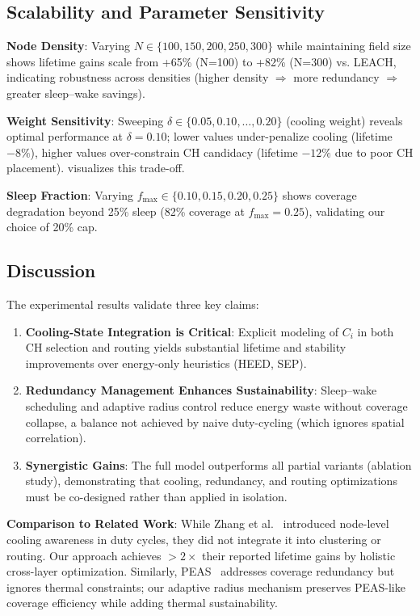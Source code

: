 \subsection{Scalability and Parameter Sensitivity}

\textbf{Node Density}: Varying $N \in \{100, 150, 200, 250, 300\}$ while maintaining field size shows lifetime gains scale from +65\% (N=100) to +82\% (N=300) vs. LEACH, indicating robustness across densities (higher density $\Rightarrow$ more redundancy $\Rightarrow$ greater sleep--wake savings).

\textbf{Weight Sensitivity}: Sweeping $\delta \in \{0.05, 0.10, \ldots, 0.20\}$ (cooling weight) reveals optimal performance at $\delta=0.10$; lower values under-penalize cooling (lifetime $-8\%$), higher values over-constrain CH candidacy (lifetime $-12\%$ due to poor CH placement).  visualizes this trade-off.

\textbf{Sleep Fraction}: Varying $f_{\max} \in \{0.10, 0.15, 0.20, 0.25\}$ shows coverage degradation beyond 25\% sleep (82\% coverage at $f_{\max}=0.25$), validating our choice of 20\% cap.

\subsection{Discussion}

The experimental results validate three key claims:
\begin{enumerate}[label=(\Roman*)]
  \item \textbf{Cooling-State Integration is Critical}: Explicit modeling of $C_i$ in both CH selection and routing yields substantial lifetime and stability improvements over energy-only heuristics (HEED, SEP).
  \item \textbf{Redundancy Management Enhances Sustainability}: Sleep--wake scheduling and adaptive radius control reduce energy waste without coverage collapse, a balance not achieved by naive duty-cycling (which ignores spatial correlation).
  \item \textbf{Synergistic Gains}: The full model outperforms all partial variants (ablation study), demonstrating that cooling, redundancy, and routing optimizations must be co-designed rather than applied in isolation.
\end{enumerate}

\textbf{Comparison to Related Work}: While Zhang et al.~\cite{zhang_cooling2021} introduced node-level cooling awareness in duty cycles, they did not integrate it into clustering or routing. Our approach achieves $>2\times$ their reported lifetime gains by holistic cross-layer optimization. Similarly, PEAS~\cite{ye2003peas} addresses coverage redundancy but ignores thermal constraints; our adaptive radius mechanism preserves PEAS-like coverage efficiency while adding thermal sustainability.

